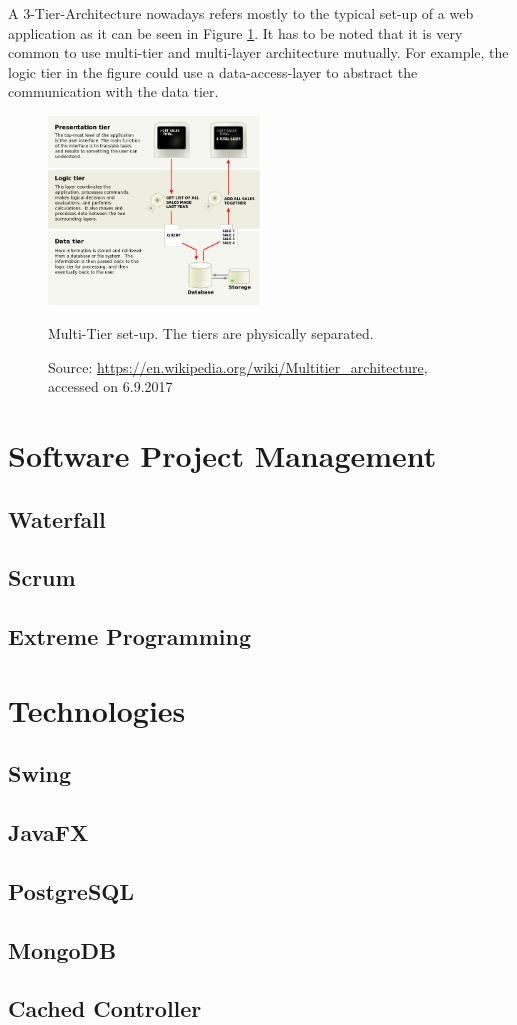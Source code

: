 A 3-Tier-Architecture nowadays refers mostly to the typical set-up of a web application as it can be seen in Figure \ref{fig:multi-tier}. It has to be noted that it is very common to use multi-tier and multi-layer architecture mutually. For example, the logic tier in the figure could use a data-access-layer to abstract the communication with the data tier. 

\begin{figure}[htbp]
	\centering
	\label{fig:multi-tier}
	\includegraphics[width=0.5\textwidth]{./content/pictures/multi-tier.jpg}
	\caption{Multi-Tier set-up. The tiers are physically separated.}
	\caption*{Source: \href{https://en.wikipedia.org/wiki/Multitier_architecture}{https://en.wikipedia.org/wiki/Multitier\_architecture}, accessed on 6.9.2017}
\end{figure}

\section{Software Project Management}
\subsection{Waterfall}
\subsection{Scrum}
\subsection{Extreme Programming}

\section{Technologies}
\subsection{Swing}
\subsection{JavaFX}
\subsection{PostgreSQL}
\subsection{MongoDB}
\subsection{Cached Controller}
\newpage
